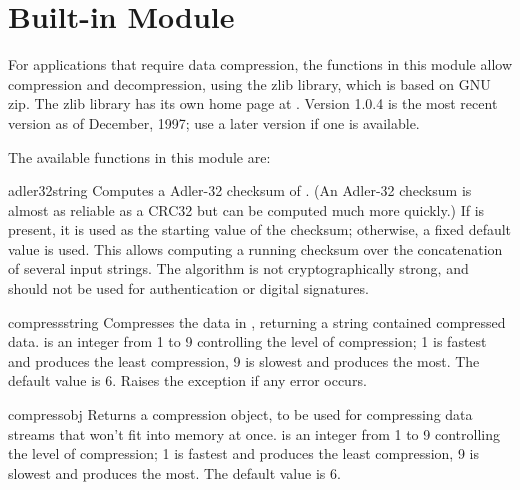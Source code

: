 
\section{Built-in Module }
\label{module-zlib}

For applications that require data compression, the functions in this
module allow compression and decompression, using the zlib library,
which is based on GNU zip.  The zlib library has its own home page at
.
Version 1.0.4 is the most recent version as of December, 1997; use a
later version if one is available.

The available functions in this module are:

\renewcommand{\indexsubitem}{(in module zlib)}
\begin{funcdesc}{adler32}{string}
   Computes a Adler-32 checksum of .  (An Adler-32
   checksum is almost as reliable as a CRC32 but can be computed much
   more quickly.)  If  is present, it is used as the
   starting value of the checksum; otherwise, a fixed default value is
   used.  This allows computing a running checksum over the
   concatenation of several input strings.  The algorithm is not
   cryptographically strong, and should not be used for
   authentication or digital signatures.
\end{funcdesc}

\begin{funcdesc}{compress}{string}
Compresses the data in , returning a string contained
compressed data.   is an integer from 1 to 9 controlling
the level of compression; 1 is fastest and produces the least
compression, 9 is slowest and produces the most.  The default value is
6.  Raises the  exception if any error occurs.
\end{funcdesc}

\begin{funcdesc}{compressobj}{}
Returns a compression object, to be used for compressing data streams
  that won't fit into memory at once.   is an integer from
  1 to 9 controlling the level of compression; 1 is fastest and
  produces the least compression, 9 is slowest and produces the most.
  The default value is 6.
\end{funcdesc}

